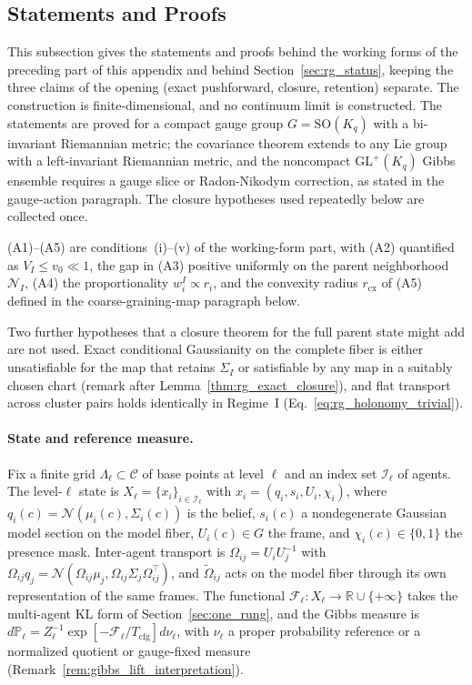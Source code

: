 \subsection{Statements and Proofs}
\label{app:rigorous_rg}

This subsection gives the statements and proofs behind the working forms of the preceding part of this appendix and behind Section~\ref{sec:rg_status}, keeping the three claims of the opening (exact pushforward, closure, retention) separate. The construction is finite-dimensional, and no continuum limit is constructed. The statements are proved for a compact gauge group $G = \mathrm{SO}(K_q)$ with a bi-invariant Riemannian metric; the covariance theorem extends to any Lie group with a left-invariant Riemannian metric, and the noncompact $\mathrm{GL}^+(K_q)$ Gibbs ensemble requires a gauge slice or Radon-Nikodym correction, as stated in the gauge-action paragraph. The closure hypotheses used repeatedly below are collected once.

\begin{assumption}
\label{ass:closure_regime}
(A1)--(A5) are conditions~(i)--(v) of the working-form part, with (A2) quantified as $V_I \le v_0 \ll 1$, the gap in (A3) positive uniformly on the parent neighborhood $\mathcal{N}_I$, (A4) the proportionality $w_i^I \propto r_i$, and the convexity radius $r_{\mathrm{cx}}$ of (A5) defined in the coarse-graining-map paragraph below.
\end{assumption}

Two further hypotheses that a closure theorem for the full parent state might add are not used. Exact conditional Gaussianity on the complete fiber is either unsatisfiable for the map that retains $\Sigma_I$ or satisfiable by any map in a suitably chosen chart (remark after Lemma~\ref{thm:rg_exact_closure}), and flat transport across cluster pairs holds identically in Regime~I (Eq.~\eqref{eq:rg_holonomy_trivial}).

\paragraph{State and reference measure.}
Fix a finite grid $\Lambda_\ell \subset \mathcal{C}$ of base points at level $\ell$ and an index set $\mathcal{I}_\ell$ of agents. The level-$\ell$ state is $X_\ell = \{x_i\}_{i \in \mathcal{I}_\ell}$ with $x_i = (q_i, s_i, U_i, \chi_i)$, where $q_i(c) = \mathcal{N}(\mu_i(c), \Sigma_i(c))$ is the belief, $s_i(c)$ a nondegenerate Gaussian model section on the model fiber, $U_i(c) \in G$ the frame, and $\chi_i(c) \in \{0, 1\}$ the presence mask. Inter-agent transport is $\Omega_{ij} = U_i U_j^{-1}$ with $\Omega_{ij} q_j = \mathcal{N}(\Omega_{ij}\mu_j, \Omega_{ij}\Sigma_j\Omega_{ij}^\top)$, and $\widetilde{\Omega}_{ij}$ acts on the model fiber through its own representation of the same frames. The functional $\mathcal{F}_\ell : X_\ell \to \mathbb{R} \cup \{+\infty\}$ takes the multi-agent KL form of Section~\ref{sec:one_rung}, and the Gibbs measure is $d\mathbb{P}_\ell = Z_\ell^{-1}\exp[-\mathcal{F}_\ell/T_{\mathrm{cfg}}]d\nu_\ell$, with $\nu_\ell$ a proper probability reference or a normalized quotient or gauge-fixed measure (Remark~\ref{rem:gibbs_lift_interpretation}).

